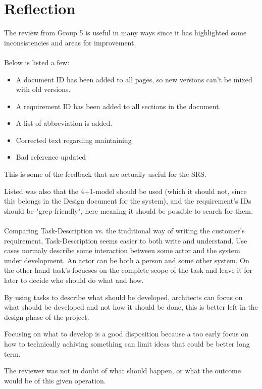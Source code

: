 \documentclass[Main]{subfiles}
\begin{document}
\chapter{Reflection}

The review from Group 5 is useful in many ways since it has highlighted some inconsistencies and areas for improvement.
\\
\\
Below is listed a few:

\begin{itemize}

\item A document ID has been added to all pages, so new versions can't be mixed with old versions.

\item A requirement ID has been added to all sections in the document.

\item A list of abbreviation is added.

\item Corrected text regarding maintaining

\item Bad reference updated 

\end{itemize}
This is some of the feedback that are actually useful for the SRS.

Listed was also that the 4+1-model should be used (which it should not, since this belongs in the Design document for the system), and the requirement's IDs should be "grep-friendly", here meaning it should be possible to search for them.
\\
\\
Comparing Task-Description vs. the traditional way of writing the customer's requirement, Task-Description seems easier to both write and understand.
Use cases normaly describe some interaction between some actor and the system under development.
An actor can be both a person and some other system.
On the other hand task's focueses on the complete scope of the task and leave it for later to decide who should do what and how.

By using tasks to describe what should be developed, architects can focus on what should be developed and not how it should be done, this is better left in the design phase of the project.

Focusing on what to develop is a good disposition because a too early focus on how to technically achiving something can limit ideas that could be better long term.

The reviewer was not in doubt of what should happen, or what the outcome would be of this given operation.
\end{document}
